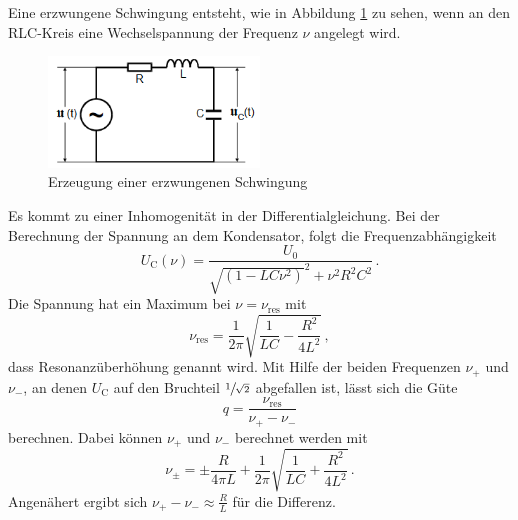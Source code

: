 Eine erzwungene Schwingung entsteht, wie in Abbildung \ref{fig:erzw} zu sehen, wenn an den RLC-Kreis eine Wechselspannung der Frequenz $\nu$ angelegt wird.
\begin{figure}
    \centering
    \caption{Erzeugung einer erzwungenen Schwingung \cite{v354}} 
    \label{fig:erzw}
    \includegraphics[width = 0.5\textwidth]{pics/Erzwungen.png}
\end{figure}
Es kommt zu einer Inhomogenität in der 
Differentialgleichung. Bei der Berechnung der Spannung an dem Kondensator, folgt die Frequenzabhängigkeit
\begin{equation}
    U_\text{C}(\nu)= \frac{U_0}{\sqrt{\left(1-LC\nu^2\right)}^2 + \nu^2 R^2 C^2} \, .
    \label{eqn:frqnzabhängi}
\end{equation}
Die Spannung hat ein Maximum bei $\nu=\nu_\text{res}$ mit 
\begin{equation}
    \nu_\text{res}= \frac{1}{2 \pi} \sqrt{\frac{1}{L C} - \frac{R^2}{4 L^2}} \, ,
    \label{eqn:omgres}
\end{equation}
dass Resonanzüberhöhung genannt wird. Mit Hilfe der beiden Frequenzen $\nu_+$ und $\nu_-$, an denen $U_\text{C}$ auf den Bruchteil $\sfrac{1}{\sqrt{2}}$
abgefallen ist, lässt sich die Güte 
\begin{equation}
    q=\frac{\nu_\text{res}}{\nu_+ - \nu_-}
    \label{eqn:güte}
\end{equation}
berechnen. Dabei können $\nu_+$ und $\nu_-$ berechnet werden mit
\begin{equation}
    \nu_\pm= \pm \frac{R}{4 \pi L} + \frac{1}{2\pi} \sqrt{\frac{1}{L C} + \frac{R^2}{4 L^2}} \, .
    \label{eqn:omgapm}
\end{equation}
Angenähert ergibt sich $\nu_+ - \nu_- \approx \frac{R}{L}$ für die Differenz.